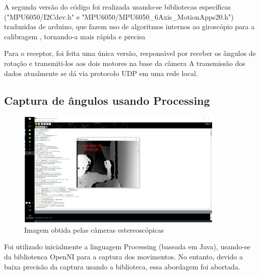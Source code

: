 A segunda versão do código foi realizada usando-se bibliotecas específicas ("MPU6050/I2Cdev.h" e "MPU6050/MPU6050\_6Axis\_MotionApps20.h") traduzidas de arduino, que fazem uso de algoritmos internos ao giroscópio para a calibragem , tornando-a mais rápida e precisa \par

Para o receptor, foi feita uma única versão, responsável por receber os ângulos de rotação e transmiti-los aos dois motores na base da câmera 
A transmissão dos dados atualmente se dá via protocolo UDP em uma rede local.\par

\subsection{ Captura de ângulos usando Processing}\label{subsec-Processing}
\begin{figure}[h!]
	\caption{\label{fig_processing}  Imagem obtida pelas câmeras estereoscópicas}
	\begin{center}
		\includegraphics[width=100mm]{processing.png}	
	\end{center}
\end{figure}
Foi utilizado inicialmente a linguagem Processing (baseada em Java), usando-se da bibliotenca OpenNI para a captura dos movimentos. No entanto, devido a baixa precisão da captura usando a biblioteca, essa abordagem foi abortada.\par


